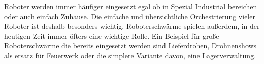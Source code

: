 \begin{flushleft}
    Roboter werden immer häufiger eingesetzt egal ob in Spezial Industrial bereichen oder auch einfach Zuhause.
    Die einfache und übersichtliche Orchestrierung vieler Roboter ist deshalb besonders wichtig.
    Roboterschwärme spielen außerdem, in der heutigen Zeit immer öfters eine wichtige Rolle.
    Ein Beispiel für große Roboterschwärme die bereits eingesetzt werden sind Lieferdrohen, Drohnenshows als 
    ersatz für Feuerwerk oder die simplere Variante davon, eine Lagerverwaltung.
\end{flushleft}